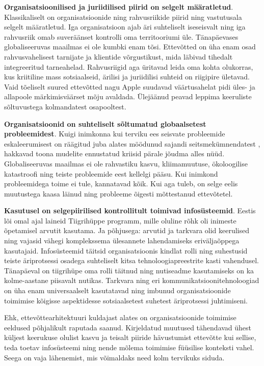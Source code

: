 \documentclass{tufte-book}
\begin{document}
\textbf{Organisatsioonilised ja juriidilised piirid on selgelt määratletud}. Klassikaliselt on organisatsioonide ning rahvusriikide piirid ning vastutusala selgelt määratletud. Iga organisatsioon ajab äri suhteliselt iseseisvalt ning iga rahvusriik omab suveräänset kontrolli oma territooriumi üle. Tänapäevases globaliseeruvas maailmas ei ole kumbki enam tõsi. Ettevõtted on üha enam osad rahvusvahelisest tarnijate ja klientide võrgustikust, mida läbivad tihedalt integreeritud tarneahelad. Rahvusriigid aga üritavad leida oma kohta olukorras, kus kriitiline mass sotsiaalseid, ärilisi ja juriidilisi suhteid on riigipire ületavad. Vaid tõeliselt suured ettevõtted nagu Apple suudavad väärtusahelat pidi üles- ja allapoole märkimisväärset mõju avaldada. Ülejäänud peavad leppima keeruliste sõltuvustega kolmandatest osapooltest. 

\textbf{Organisatsioonid on suhteliselt sõltumatud globaalsetest probleemidest}. Kuigi inimkonna kui terviku ees seisvate probleemide eskaleerumisest on räägitud juba alates möödunud sajandi seitsmekümnendatest \cite{forrester1971world}, hakkavad toona mudelite ennustatud kriisid pärale jõudma alles nüüd. Globaliseeruvas maailmas ei ole rahvastiku kasvu, kliimamuutuse, ökoloogilise katastroofi ning teiste probleemide eest kellelgi pääsu. Kui inimkond probleemidega toime ei tule, kannatavad kõik. Kui aga tuleb, on selge eelis muutustega kaasa läinud ning probleeme õigesti mõttestanud ettevõtetel. 

\textbf{Kasutusel on selgepiirilised kontrollitult toimivad infosüsteemid}. Eestis lõi omal ajal laineid Tiigrihüppe programm, mille oluline rõhk oli inimeste õpetamisel arvutit kasutama. Ja põhjusega: arvutid ja tarkvara olid keerulised ning vajasid vähegi komplekssema ülesannete lahendamiseks eriväljaõppega kasutajaid.  Infosüsteemid täitsid organisatsioonis kindlat rolli ning suhestusid teiste äriprotsessi osadega suhteliselt kitsa tehnoloogiapreestrite kasti vahendusel. Tänapäeval on tiigrihüpe oma rolli täitnud ning nutiseadme kasutamiseks on ka kolme-aastane piisavalt nutikas. Tarkvara ning eri kommunikatsioonitehnoloogiad on üha enam universaalselt kasutatavad ning imbunud organisatsioonide toimimise kõigisse aspektidesse sotsiaalsetest suhetest äriprotsessi juhtimiseni. 

Ehk, ettevõttearhitektuuri kuldajast alates on organisatsioonide toimimise eeldused põhjalikult raputada saanud. Kirjeldatud muutused tähendavad ühest küljest keerukuse olulist kasvu ja teisalt piiride hävustumist ettevõtte kui sellise, teda toetav infosüsteemi ning nende mõlema toimimise füüsilise konteksti vahel. Seega on vaja lähenemist, mis võimaldaks need kolm tervikuks siduda.
\end{document}
